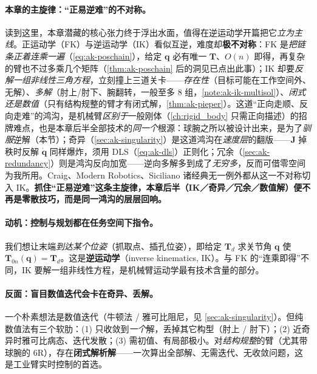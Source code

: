 \paragraph{本章的主旋律：“正易逆难”的不对称。}
读到这里，本章潜藏的核心张力终于浮出水面，值得在逆运动学开篇把它\emph{立为主线}。正运动学（FK）与逆运动学（IK）看似互逆，难度却\textbf{极不对称}：FK 是\emph{把链条正着连乘一遍}（\cref{eq:ak-poschain}），给定 $\mathbf{q}$ 必有唯一 $\mathbf{T}$、$O(n)$ 即得，再复杂的臂也不过多乘几个矩阵（\cref{thm:ak-poschain} 后的洞见已点出此事）；IK 却要\emph{反解一组非线性三角方程}，立刻撞上三道关卡——\emph{存在性}（目标可能在工作空间外、无解）、\emph{多解}（肘上/肘下、腕翻转，一般至多 8 组，\cref{note:ak-ik-multisol}）、\emph{闭式还是数值}（只有结构规整的臂才有闭式解，\cref{thm:ak-pieper}）。这道“正向走顺、反向走难”的鸿沟，是机械臂\emph{区别于}一般刚体（\cref{ch:rigid_body} 只需正向描述）的招牌难点，也是本章后半全部技术的\emph{同一个}根源：球腕之所以被设计出来，是为了\emph{驯服}逆解（本节）；奇异（\cref{sec:ak-singularity}）是这道鸿沟在\emph{速度层}的翻版——$\mathbf{J}$ 掉秩时反解 $\dot{\mathbf{q}}$ 同样爆炸，须用 DLS（\cref{eq:ak-dls}）正则化；冗余（\cref{sec:ak-redundancy}）则是鸿沟反向加宽——逆向多解多到成了\emph{无穷多}，反而可借零空间为我所用。Craig、Modern Robotics、Siciliano 诸经典无一例外都从这一不对称切入 IK\cite{craig2005introduction,lynch2017modern,siciliano2009robotics}。\textbf{抓住“正易逆难”这条主旋律，本章后半（IK／奇异／冗余／数值解）便不再是零散技巧，而是同一鸿沟的层层回响。}

\paragraph{动机：控制与规划都在任务空间下指令。}
我们想让末端\emph{到达某个位姿}（抓取点、插孔位姿），即给定 $\mathbf{T}_d$ 求关节角 $\mathbf{q}$ 使 $\mathbf{T}_{0n}(\mathbf{q})=\mathbf{T}_d$。这是\textbf{逆运动学}（inverse kinematics, IK）。与 FK 的“连乘即得”不同，IK 要解一组非线性方程，是机械臂运动学最有技术含量的部分。

\paragraph{反面：盲目数值迭代会卡在奇异、丢解。}
一个朴素想法是数值迭代（牛顿法 / 雅可比阻尼，见 \cref{sec:ak-singularity}）。但纯数值法有三个软肋：(1) 只收敛到\emph{一个}解，丢掉其它构型（肘上 / 肘下）；(2) 近奇异时雅可比病态、迭代发散；(3) 需初值、有局部极小。对\emph{结构规整}的臂（尤其带球腕的 6R），存在\textbf{闭式解析解}——一次算出全部解、无需迭代、无收敛问题，这是工业臂实时控制的首选。

